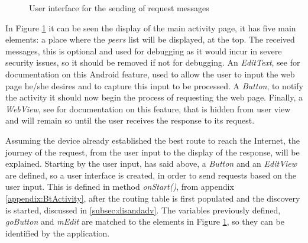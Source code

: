 \begin{figure}[ht]
   \noindent{}
	\caption{\label{fig:initScreen} User interface for the sending of request messages}
\end{figure}

In Figure \ref{fig:initScreen} it can be seen the display of the main activity page, it has five main elements: a place where the \textit{peers} list will be displayed, at the top. The received messages, this is optional and used for debugging as it would incur in severe security issues, so it should be removed if not for debugging. An \textit{EditText}, see \cite{edittext} for documentation on this Android feature, used to allow the user to input the web page he/she desires and to capture this input to be processed. A \textit{Button}, to notify the activity it should now begin the process of requesting the web page. Finally, a \textit{WebView}, see \cite{webview} for documentation on this feature, that is hidden from user view and will remain so until the user receives the response to its request.

Assuming the device already established the best route to reach the Internet, the journey of the request, from the user input to the display of the response, will be explained. Starting by the user input, has said above, a \textit{Button} and an \textit{EditView} are defined, so a user interface is created, in order to send requests based on the user input. This is defined in method \textit{onStart()}, from appendix \ref{appendix:BtActivity}, after the routing table is first populated and the discovery is started, discussed in \ref{subsec:disandadv}. The variables previously defined, \textit{goButton} and \textit{mEdit} are matched to the elements in Figure \ref{fig:initScreen}, so they can be identified by the application.

